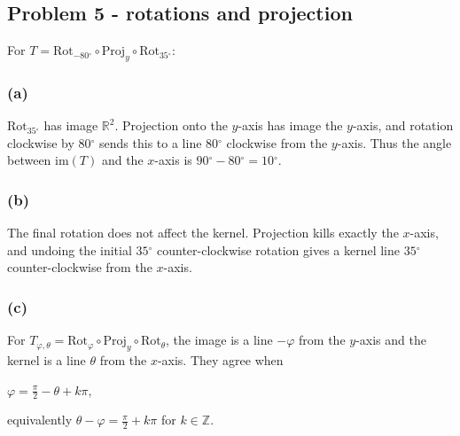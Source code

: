 \subsection{Problem 5 - rotations and projection}

For \(T = \text{Rot}_{- 80{^\circ}} \circ \text{Proj}_{y} \circ \text{Rot}_{35{^\circ}}\):

\subsubsection{(a)}

\(\text{Rot}_{35{^\circ}}\) has image \(\mathbb{R}^{2}\). Projection onto the \(y\)-axis has image the \(y\)-axis, and rotation clockwise by \(80{^\circ}\) sends this to a line \(80{^\circ}\) clockwise from the \(y\)-axis. Thus the angle between \(\text{im}(T)\) and the \(x\)-axis is \(90{^\circ} - 80{^\circ} = 10{^\circ}\).

\subsubsection{(b)}

The final rotation does not affect the kernel. Projection kills exactly the \(x\)-axis, and undoing the initial \(35{^\circ}\) counter-clockwise rotation gives a kernel line \(35{^\circ}\) counter-clockwise from the \(x\)-axis.

\subsubsection{(c)}

For \(T_{\varphi,\theta} = \text{Rot}_{\varphi} \circ \text{Proj}_{y} \circ \text{Rot}_{\theta}\), the image is a line \(- \varphi\) from the \(y\)-axis and the kernel is a line \(\theta\) from the \(x\)-axis. They agree when

\(\varphi = \frac{\pi}{2} - \theta + k\pi,\)

equivalently \(\theta - \varphi = \frac{\pi}{2} + k\pi\) for \(k \in \mathbb{Z}\).
